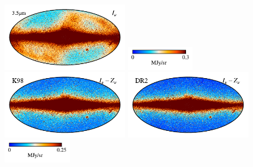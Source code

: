 \documentclass[twocolumn]{aa}
\begin{document}
\begin{figure}
    \includegraphics[height=2.90cm]{figs/compare_zsma/cosmoglobe_ma_03.pdf}%
    \includegraphics[width=2.90cm,angle=90]{figs/compare_zsma/cbar_tot_03.pdf}%
    \includegraphics[height=2.90cm]{figs/compare_zsma/dirbe_zsma_03.pdf}%
    \includegraphics[height=2.90cm]{figs/compare_zsma/cosmoglobe_zsma_03.pdf}%
    \includegraphics[width=2.90cm,angle=90]{figs/compare_zsma/cbar_03.pdf}%
      \\


\end{figure}
\end{document}
